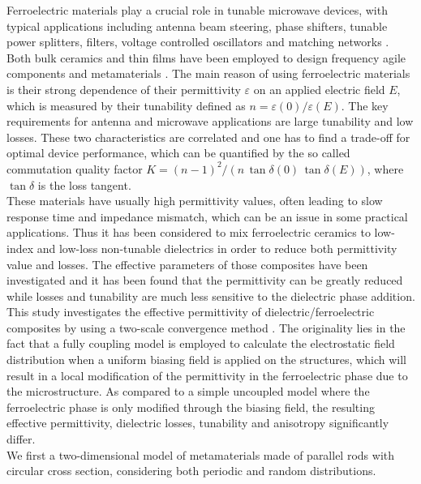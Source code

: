 \documentclass[%
 reprint,
 amsmath,amssymb,
 aps,
]{revtex4-2}
\begin{document}
Ferroelectric materials play a crucial role in tunable
microwave devices, with typical applications including antenna beam steering,
phase shifters, tunable power splitters, filters, voltage controlled oscillators and
matching networks \cite{Tagantsev2018}. Both bulk ceramics and thin films have
been employed to design frequency agile components \cite{vendik1999ferroelectric, lancaster1998thin,
xi2000oxide} and metamaterials \cite{Hand2008, Zhao2008}. The main reason of using
ferroelectric materials is their strong dependence of their permittivity $\varepsilon$
on an applied electric field $E$, which is measured by their tunability defined as $n = \varepsilon(0)/\varepsilon(E)$.
The key requirements for antenna and microwave applications are large tunability and low losses.
These two characteristics are correlated and one has to find a trade-off for optimal device
performance, which can be quantified by the so called commutation quality factor
$K = (n -1)^2/(n\, \tan\delta(0)\,\tan\delta(E))$, where $\tan\delta$ is the loss tangent.\\
These materials have usually high permittivity values,
often leading to slow response time and impedance mismatch, which can be an issue in some practical
applications. Thus it has been considered to mix ferroelectric ceramics to low-index and
low-loss non-tunable dielectrics in order to reduce both permittivity value and losses.
The effective parameters of those composites have been investigated \cite{Sherman2006,
jylha2008tunability, Sherman2004, ASTAFIEV20032381} and it has been found that the
permittivity can be greatly reduced while losses and tunability are much less sensitive to the
dielectric phase addition.\\
This study investigates the effective permittivity of dielectric/ferroelectric composites
by using a two-scale convergence method \cite{Allaire92, Guenneau2000}.
The originality lies in the fact that a fully coupling model is employed to
calculate the electrostatic field distribution when a uniform biasing field is
applied on the structures, which will result in a local modification of the permittivity
in the ferroelectric phase due to the microstructure. As compared to a simple uncoupled model where the
ferroelectric phase is only modified through the biasing field,
the resulting effective permittivity, dielectric losses, tunability and
anisotropy significantly differ. \\
We first a two-dimensional model of metamaterials made of parallel rods with circular cross section,
considering both periodic and random distributions.
\end{document}

